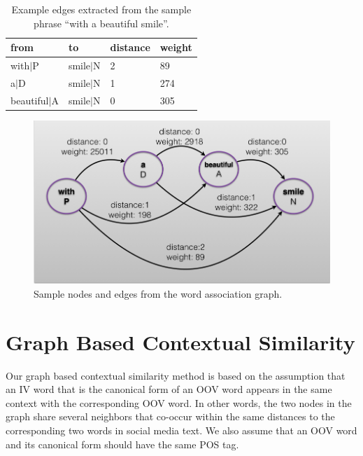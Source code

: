 \documentclass[a4paper,onesided,12pt]{report}
\begin{document}
\begin{table}[hbt]
  \caption{Example edges extracted from the sample phrase  ``with a beautiful smile''.}
  \centering
  \begin{tabular}[tc]{|l|l|l|l|}
    \hline
\textbf{from} & \textbf{to} & \textbf{distance} & \textbf{weight} \\ \hline
 with$|$P &  smile$|$N & 2 & 89 \\ \hline
 a$|$D & smile$|$N & 1 & 274 \\ \hline
 beautiful$|$A & smile$|$N & 0 & 305 \\ \hline
\end{tabular}
\label{tab:edges}
\end{table}

\begin{figure}[htb]
\begin{center}
\includegraphics[scale=0.5]{fig/edges}
\caption{Sample nodes and edges from the word association graph.}
\label{fig:edges}
\end{center}
\end{figure}


\section{Graph Based Contextual Similarity}
\label{sec:consim}

Our graph based contextual similarity method is based on the assumption that an IV word that is the canonical form of an OOV word appears in the same context with the corresponding OOV word. In other words, the two nodes in the graph share several neighbors that co-occur within the same distances to the corresponding two words in social media text. We also assume that an OOV word and its canonical form should have the same POS tag.
\end{document}
